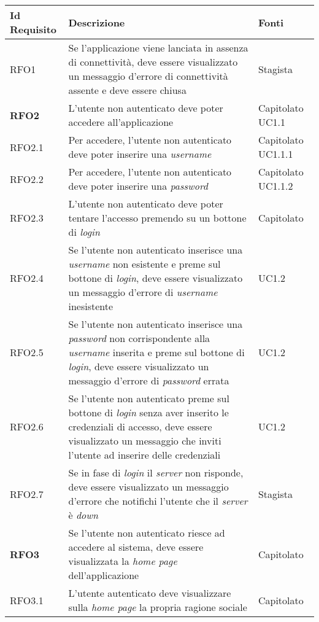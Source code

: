 {\renewcommand{\arraystretch}{2}
\begin{center}
\begin{longtable}{ | >{\centering\arraybackslash}p{2.5cm} | >{\arraybackslash}p{7cm} | >{\centering\arraybackslash}p{2cm} | }
        
\hline
\textbf{Id Requisito} & \textbf{Descrizione} & \textbf{Fonti} \\ \hline
\endhead
RFO1 & Se l'applicazione viene lanciata in assenza di connettività, deve essere visualizzato un messaggio d'errore di connettività assente e deve essere chiusa & Stagista \\ \hline
\textbf{RFO2} & L'utente non autenticato deve poter accedere all'applicazione & Capitolato UC1.1 \\ \hline
RFO2.1 & Per accedere, l'utente non autenticato deve poter inserire una \textit{username} & Capitolato UC1.1.1 \\ \hline
RFO2.2 & Per accedere, l'utente non autenticato deve poter inserire una \textit{password} & Capitolato UC1.1.2 \\ \hline
RFO2.3 & L'utente non autenticato deve poter tentare l'accesso premendo su un bottone di \textit{login} & Capitolato\\ \hline
RFO2.4 & Se l'utente non autenticato inserisce una \textit{username} non esistente e preme sul bottone di \textit{login}, deve essere visualizzato un messaggio d'errore di \textit{username} inesistente & UC1.2 \\ \hline
RFO2.5 & Se l'utente non autenticato inserisce una \textit{password} non corrispondente alla \textit{username} inserita e preme sul bottone di \textit{login}, deve essere visualizzato un messaggio d'errore di \textit{password} errata & UC1.2 \\ \hline
RFO2.6 & Se l'utente non autenticato preme sul bottone di \textit{login} senza aver inserito le credenziali di accesso, deve essere visualizzato un messaggio che inviti l'utente ad inserire delle credenziali & UC1.2 \\ \hline
RFO2.7 & Se in fase di \textit{login} il \textit{server} non risponde, deve essere visualizzato un messaggio d'errore che notifichi l'utente che il \textit{server} è \textit{down} & Stagista \\ \hline
\textbf{RFO3} & Se l'utente non autenticato riesce ad accedere al sistema, deve essere visualizzata la \textit{home page} dell'applicazione & Capitolato \\ \hline
RFO3.1 & L'utente autenticato deve visualizzare sulla \textit{home page} la propria ragione sociale & Capitolato \\ \hline

\end{longtable}
\end{center}}

